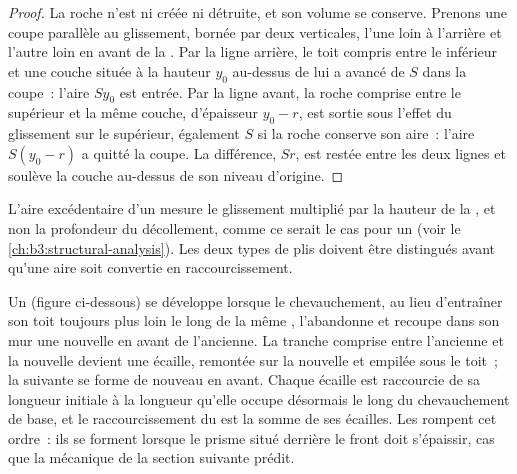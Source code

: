 \begin{proof}
La roche n'est ni créée ni détruite, et son volume se conserve. Prenons une coupe
parallèle au glissement, bornée par deux verticales, l'une loin à l'arrière et l'autre loin en
avant de la . Par la ligne arrière, le toit compris entre le
 inférieur et une couche située à la hauteur $y_0$ au-dessus de lui a avancé de $S$ dans la coupe~: l'aire
$Sy_0$ est entrée. Par la ligne avant, la roche comprise entre le  supérieur
et la même couche, d'épaisseur $y_0 - r$, est sortie sous l'effet du glissement sur le  supérieur,
également $S$ si la roche conserve son aire~: l'aire $S(y_0 - r)$
a quitté la coupe. La différence, $Sr$, est restée entre les deux lignes et soulève
la couche au-dessus de son niveau d'origine.
\end{proof}

L'aire excédentaire d'un  mesure le glissement multiplié par la hauteur de
la , et non la profondeur du décollement, comme ce serait le cas pour un
 (voir le \cref{ch:b3:structural-analysis}). Les deux types de plis
doivent être distingués avant qu'une aire soit convertie en raccourcissement.


Un  (figure ci-dessous) se développe lorsque le chevauchement, au lieu d'entraîner son toit toujours
plus loin le long de la même , l'abandonne et recoupe dans son mur une nouvelle 
en avant de l'ancienne. La tranche comprise entre l'ancienne et la nouvelle  devient une
écaille, remontée sur la nouvelle  et empilée sous le toit~; la  suivante
se forme de nouveau en avant. Chaque écaille est raccourcie de sa longueur initiale à la
longueur qu'elle occupe désormais le long du chevauchement de base, et le raccourcissement du  est
la somme de ses écailles. Les  rompent cet ordre~: ils se forment
lorsque le prisme situé derrière le front doit s'épaissir, cas que la mécanique de la
section suivante prédit.

